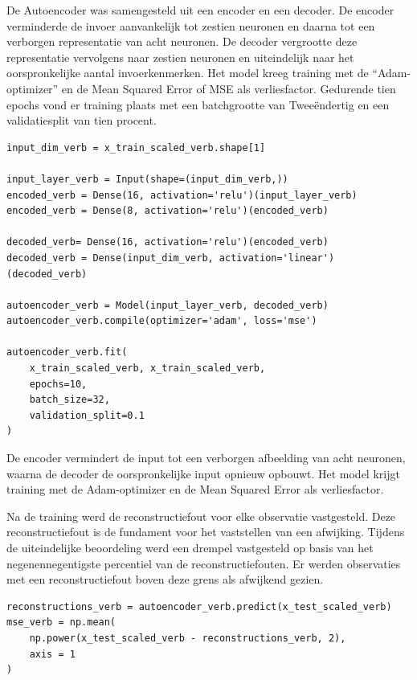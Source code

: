 {{{De Autoencoder was samengesteld uit een encoder en een decoder. De encoder verminderde de invoer aanvankelijk tot zestien neuronen en daarna tot een verborgen representatie van acht neuronen. De decoder vergrootte deze representatie vervolgens naar zestien neuronen en uiteindelijk naar het oorspronkelijke aantal invoerkenmerken. Het model kreeg training met de ``Adam-optimizer'' en de Mean Squared Error of MSE als verliesfactor. Gedurende tien epochs vond er training plaats met een batchgrootte van Tweeëndertig en een validatiesplit van tien procent.

\begin{listing}[H]
\begin{verbatim}
input_dim_verb = x_train_scaled_verb.shape[1]

input_layer_verb = Input(shape=(input_dim_verb,))
encoded_verb = Dense(16, activation='relu')(input_layer_verb)
encoded_verb = Dense(8, activation='relu')(encoded_verb)

decoded_verb= Dense(16, activation='relu')(encoded_verb)
decoded_verb = Dense(input_dim_verb, activation='linear')(decoded_verb)

autoencoder_verb = Model(input_layer_verb, decoded_verb)
autoencoder_verb.compile(optimizer='adam', loss='mse')

autoencoder_verb.fit(
    x_train_scaled_verb, x_train_scaled_verb,
    epochs=10,
    batch_size=32,
    validation_split=0.1
)
\end{verbatim}
\caption[Code snippet: opbouw en training van de Autoencoder]{Codefragment van de opbouw en training van de Autoencoder op de MetroPT-3-dataset.}
\end{listing}

De encoder vermindert de input tot een verborgen afbeelding van acht neuronen, waarna de decoder de oorspronkelijke input opnieuw opbouwt. Het model krijgt training met de Adam-optimizer en de Mean Squared Error als verliesfactor.

Na de training werd de reconstructiefout voor elke observatie  vastgesteld. Deze reconstructiefout is de fundament voor het vaststellen van een afwijking. Tijdens de uiteindelijke beoordeling werd een drempel vastgesteld op basis van het negenennegentigste percentiel van de reconstructiefouten. Er werden observaties met een reconstructiefout boven deze grens als afwijkend gezien.

\begin{listing}[H]
\begin{verbatim}
reconstructions_verb = autoencoder_verb.predict(x_test_scaled_verb)
mse_verb = np.mean(
    np.power(x_test_scaled_verb - reconstructions_verb, 2), 
    axis = 1
)


\end{verbatim}
\end{listing}}}}
